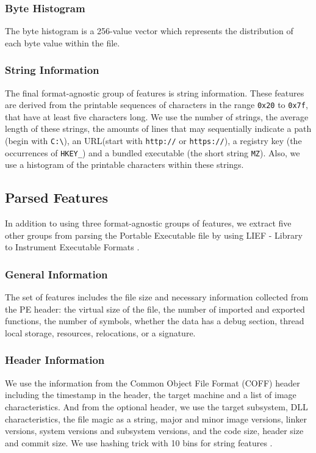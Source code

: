 \subsubsection{Byte Histogram}

The byte histogram is a 256-value vector which represents the distribution of each byte value within the file.

\subsubsection{String Information}

The final format-agnostic group of features is string information. These features are derived from the printable sequences of characters in the range \verb|0x20| to \verb|0x7f|, that have at least five characters long. We use the number of strings, the average length of these strings, the amounts of lines  that may sequentially indicate a path (begin with \verb|C:\|), an URL(start with \verb|http://| or \verb|https://|), a registry key (the occurrences of \verb|HKEY_|) and a bundled executable (the short string \verb|MZ|). Also, we use a histogram of the printable characters within these strings.

\subsection{Parsed Features}

In addition to using three format-agnostic groups of features, we extract five other groups from parsing the Portable Executable file by using LIEF - Library to Instrument Executable Formats \cite{lief}.

\subsubsection{General Information}

The set of features includes the file size and necessary information collected from the PE header: the virtual size of the file, the number of imported and exported functions, the number of symbols, whether the data has a debug section, thread local storage, resources, relocations, or a signature.

\subsubsection{Header Information}

We use the information from the Common Object File Format (COFF) header including the timestamp in the header, the target machine and a list of image characteristics. And from the optional header, we use the target subsystem, DLL  characteristics,  the file magic as a string, major and minor image versions, linker versions, system versions and subsystem versions, and the code size, header size and commit size. We use hashing trick with 10 bins for string features \cite{weinberger2009feature}.

